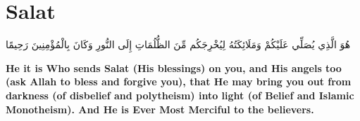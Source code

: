 \chapter{Salat}
\begin{center}
    {\Huge    
        \begin{Arabic}
            هُوَ الَّذِي يُصَلِّي عَلَيْكُمْ وَمَلَائِكَتُهُ لِيُخْرِجَكُم مِّنَ الظُّلُمَاتِ إِلَى النُّورِ وَكَانَ بِالْمُؤْمِنِينَ رَحِيمًا
        \end{Arabic}
    }    
\end{center}
\vspace*{\fill}
\vspace{3cm}
\begin{center}
    \large \textbf{He it is Who sends Salat (His blessings) on you, and His angels too (ask Allah to bless and forgive you), that He may bring you out from darkness (of disbelief and polytheism) into light (of Belief and Islamic Monotheism). And He is Ever Most Merciful to the believers.}
\end{center}
